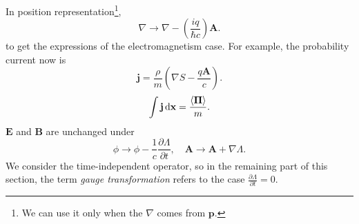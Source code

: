 \documentclass{article}
\theoremstyle{1}
\newcommand{\pa}{\partial}
\begin{document}
In position representation\footnote{We can use it only when the $\nabla$ comes from $\mathbf{p}$.},
\begin{equation}
    \nabla\longrightarrow \nabla-\left(\frac{iq}{\hbar c}\right)\mathbf{A}.
\end{equation}
to get the expressions of the electromagnetism case. For example, the probability current now is 
\begin{equation}\label{12.8}
    \mathbf{j}=\frac{\rho}{m}\left(\nabla S-\frac{q\mathbf{A}}{c}\right).
\end{equation}
\begin{equation}
    \int \mathbf{j}\dd{\mathbf{x}}=\frac{\expval{\mathbf{\Pi}}}{m}.
\end{equation}
$\mathbf{E}$ and $\mathbf{B}$ are unchanged under
\begin{equation}
    \phi\rightarrow \phi-\frac{1}{c}\frac{\pa \Lambda}{\pa t},\quad \mathbf{A}\rightarrow\mathbf{A}+\nabla \Lambda.
\end{equation}
We consider the time-independent operator, so in the remaining part of this section, the term \textit{gauge transformation} refers to the case $\frac{\pa \Lambda}{\pa t}=0$.
\end{document}
